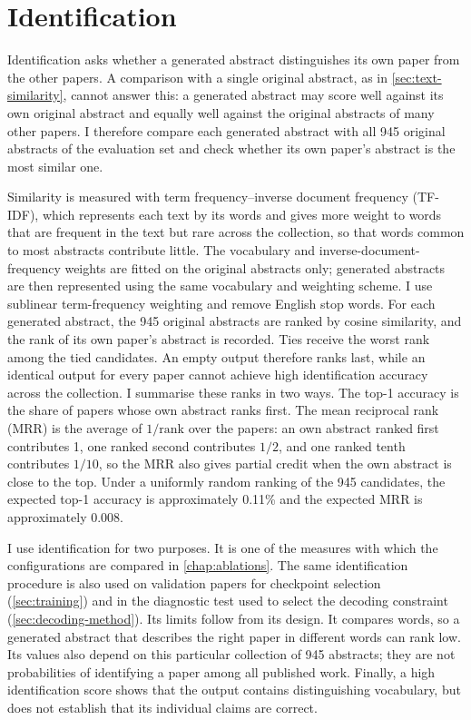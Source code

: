 \section{Identification}
\label{sec:identification}

Identification asks whether a generated abstract distinguishes its own paper from the other papers. A comparison with a single original abstract, as in \autoref{sec:text-similarity}, cannot answer this: a generated abstract may score well against its own original abstract and equally well against the original abstracts of many other papers. I therefore compare each generated abstract with all 945 original abstracts of the evaluation set and check whether its own paper's abstract is the most similar one.

Similarity is measured with term frequency--inverse document frequency (TF-IDF), which represents each text by its words and gives more weight to words that are frequent in the text but rare across the collection, so that words common to most abstracts contribute little. The vocabulary and inverse-document-frequency weights are fitted on the original abstracts only; generated abstracts are then represented using the same vocabulary and weighting scheme. I use sublinear term-frequency weighting and remove English stop words. For each generated abstract, the 945 original abstracts are ranked by cosine similarity, and the rank of its own paper's abstract is recorded. Ties receive the worst rank among the tied candidates. An empty output therefore ranks last, while an identical output for every paper cannot achieve high identification accuracy across the collection. I summarise these ranks in two ways. The top-1 accuracy is the share of papers whose own abstract ranks first. The mean reciprocal rank (MRR) is the average of $1/\text{rank}$ over the papers: an own abstract ranked first contributes 1, one ranked second contributes $1/2$, and one ranked tenth contributes $1/10$, so the MRR also gives partial credit when the own abstract is close to the top. Under a uniformly random ranking of the 945 candidates, the expected top-1 accuracy is approximately 0.11\% and the expected MRR is approximately 0.008.

I use identification for two purposes. It is one of the measures with which the configurations are compared in \autoref{chap:ablations}. The same identification procedure is also used on validation papers for checkpoint selection (\autoref{sec:training}) and in the diagnostic test used to select the decoding constraint (\autoref{sec:decoding-method}). Its limits follow from its design. It compares words, so a generated abstract that describes the right paper in different words can rank low. Its values also depend on this particular collection of 945 abstracts; they are not probabilities of identifying a paper among all published work. Finally, a high identification score shows that the output contains distinguishing vocabulary, but does not establish that its individual claims are correct.

